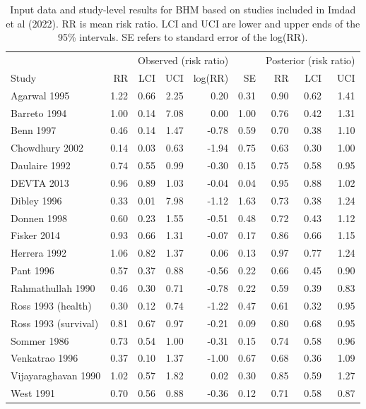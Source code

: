 \documentclass[12pt]{article}
\begin{document}
\begin{table}
\caption{Input data and study-level results for BHM based on studies included in Imdad et al (2022). RR is mean risk ratio. LCI and UCI are lower and upper ends of the 95\% intervals. SE refers to standard error of the log(RR).}
\label{tab:summary}
\begin{tabular}[t]{lrrrrrrrr}
\toprule
\multicolumn{1}{c}{} & \multicolumn{5}{c}{Observed (risk ratio)} & \multicolumn{3}{c}{Posterior (risk ratio)} \\
\cmidrule(l{3pt}r{3pt}){2-6} \cmidrule(l{3pt}r{3pt}){7-9}
Study & RR & LCI & UCI & log(RR) & SE & RR & LCI & UCI\\
\midrule
Agarwal 1995 & 1.22 & 0.66 & 2.25 & 0.20 & 0.31 & 0.90 & 0.62 & 1.41\\
Barreto 1994 & 1.00 & 0.14 & 7.08 & 0.00 & 1.00 & 0.76 & 0.42 & 1.31\\
Benn 1997 & 0.46 & 0.14 & 1.47 & -0.78 & 0.59 & 0.70 & 0.38 & 1.10\\
Chowdhury 2002 & 0.14 & 0.03 & 0.63 & -1.94 & 0.75 & 0.63 & 0.30 & 1.00\\
Daulaire 1992 & 0.74 & 0.55 & 0.99 & -0.30 & 0.15 & 0.75 & 0.58 & 0.95\\
\addlinespace
DEVTA 2013 & 0.96 & 0.89 & 1.03 & -0.04 & 0.04 & 0.95 & 0.88 & 1.02\\
Dibley 1996 & 0.33 & 0.01 & 7.98 & -1.12 & 1.63 & 0.73 & 0.38 & 1.24\\
Donnen 1998 & 0.60 & 0.23 & 1.55 & -0.51 & 0.48 & 0.72 & 0.43 & 1.12\\
Fisker 2014 & 0.93 & 0.66 & 1.31 & -0.07 & 0.17 & 0.86 & 0.66 & 1.15\\
Herrera 1992 & 1.06 & 0.82 & 1.37 & 0.06 & 0.13 & 0.97 & 0.77 & 1.24\\
\addlinespace
Pant 1996 & 0.57 & 0.37 & 0.88 & -0.56 & 0.22 & 0.66 & 0.45 & 0.90\\
Rahmathullah 1990 & 0.46 & 0.30 & 0.71 & -0.78 & 0.22 & 0.59 & 0.39 & 0.83\\
Ross 1993 (health) & 0.30 & 0.12 & 0.74 & -1.22 & 0.47 & 0.61 & 0.32 & 0.95\\
Ross 1993 (survival) & 0.81 & 0.67 & 0.97 & -0.21 & 0.09 & 0.80 & 0.68 & 0.95\\
Sommer 1986 & 0.73 & 0.54 & 1.00 & -0.31 & 0.15 & 0.74 & 0.58 & 0.96\\
\addlinespace
Venkatrao 1996 & 0.37 & 0.10 & 1.37 & -1.00 & 0.67 & 0.68 & 0.36 & 1.09\\
Vijayaraghavan 1990 & 1.02 & 0.57 & 1.82 & 0.02 & 0.30 & 0.85 & 0.59 & 1.27\\
West 1991 & 0.70 & 0.56 & 0.88 & -0.36 & 0.12 & 0.71 & 0.58 & 0.87\\
\bottomrule
\end{tabular}
\end{table}
\end{document}
